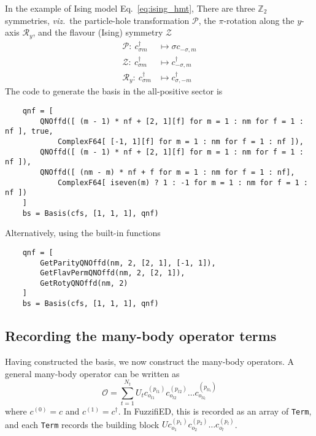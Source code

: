 \documentclass{timesjhep}
\begin{document}
In the example of Ising model Eq.~\eqref{eq:ising_hmt}, There are three $\mathbb{Z}_2$ symmetries, \textit{viz.}~the particle-hole transformation $\mathcal{P}$, the $\pi$-rotation along the $y$-axis $\mathcal{R}_y$, and the flavour (Ising) symmetry $\mathcal{Z}$
\begin{align}
    \mathcal{P}:\ c^\dagger_{\sigma m}&\mapsto\sigma c_{-\sigma,m}\nonumber\\
    \mathcal{Z}:\ c^\dagger_{\sigma m}&\mapsto c^\dagger_{-\sigma,m}\nonumber\\
    \mathcal{R}_y:\ c^\dagger_{\sigma m}&\mapsto c^\dagger_{\sigma,-m}
\end{align}
The code to generate the basis in the all-positive sector is 
\begin{lstlisting}
    qnf = [
        QNOffd([ (m - 1) * nf + [2, 1][f] for m = 1 : nm for f = 1 : nf ], true, 
            ComplexF64[ [-1, 1][f] for m = 1 : nm for f = 1 : nf ]),
        QNOffd([ (m - 1) * nf + [2, 1][f] for m = 1 : nm for f = 1 : nf ]),
        QNOffd([ (nm - m) * nf + f for m = 1 : nm for f = 1 : nf], 
            ComplexF64[ iseven(m) ? 1 : -1 for m = 1 : nm for f = 1 : nf ])
    ]
    bs = Basis(cfs, [1, 1, 1], qnf) 
\end{lstlisting}
Alternatively, using the built-in functions
\begin{lstlisting}
    qnf = [ 
        GetParityQNOffd(nm, 2, [2, 1], [-1, 1]), 
        GetFlavPermQNOffd(nm, 2, [2, 1]), 
        GetRotyQNOffd(nm, 2) 
    ]
    bs = Basis(cfs, [1, 1, 1], qnf)
\end{lstlisting}

\subsection{Recording the many-body operator terms}
\label{sec:ed_term}

Having constructed the basis, we now construct the many-body operators. A general many-body operator can be written as
\begin{equation}
    \mathcal{O} =\sum_{t=1}^{N_t}U_tc^{(p_{t1})}_{o_{t1}}c^{(p_{t2})}_{o_{t2}}\dots c^{(p_{tl_t})}_{o_{tl_t}}
\end{equation}
where $c^{(0)}=c$ and $c^{(1)}=c^\dagger$. In FuzzifiED, this is recorded as an array of \lstinline|Term|, and each \lstinline|Term| records the building block $Uc^{(p_{1})}_{o_{1}}c^{(p_{2})}_{o_{2}}\dots c^{(p_{l})}_{o_{l}}$. 
\end{document}
